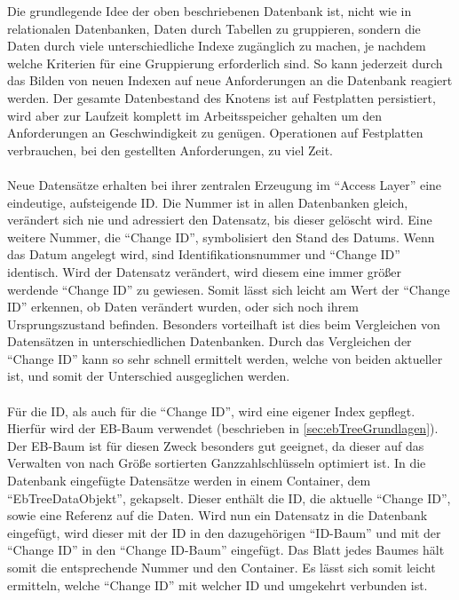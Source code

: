 \documentclass[a4paper,11pt,oneside,%
headsepline,												%
footsepline,												%
bibtotocnumbered									%
]{scrreprt}
\begin{document}
Die grundlegende Idee der oben beschriebenen Datenbank ist, nicht wie in relationalen Datenbanken, Daten durch Tabellen zu gruppieren, sondern die Daten durch viele unterschiedliche Indexe zugänglich zu machen, je nachdem welche Kriterien für eine Gruppierung erforderlich sind. So kann jederzeit durch das Bilden von neuen Indexen auf neue Anforderungen an die Datenbank reagiert werden. Der gesamte Datenbestand des Knotens ist auf Festplatten persistiert, wird aber zur Laufzeit komplett im Arbeitsspeicher gehalten um den Anforderungen an Geschwindigkeit zu genügen. Operationen auf Festplatten verbrauchen, bei den gestellten Anforderungen, zu viel Zeit.\\\\
Neue Datensätze erhalten bei ihrer zentralen Erzeugung im \enquote{Access Layer} eine eindeutige, aufsteigende \ac{ID}. Die Nummer ist in allen Datenbanken gleich, verändert sich nie und adressiert den Datensatz, bis dieser gelöscht wird. Eine weitere Nummer, die \enquote{Change ID}, symbolisiert den Stand des Datums. Wenn das Datum angelegt wird, sind Identifikationsnummer und \enquote{Change ID} identisch. Wird der Datensatz verändert, wird diesem eine immer größer werdende \enquote{Change ID} zu gewiesen. Somit lässt sich leicht am Wert der \enquote{Change ID}  erkennen, ob Daten verändert wurden, oder sich noch ihrem Ursprungszustand befinden. Besonders vorteilhaft ist dies beim Vergleichen von Datensätzen in unterschiedlichen Datenbanken. Durch das Vergleichen der \enquote{Change ID} kann so sehr schnell ermittelt werden, welche von beiden aktueller ist, und somit der Unterschied ausgeglichen werden.\\\\
Für die \ac{ID}, als auch für die \enquote{Change ID}, wird eine eigener Index gepflegt. Hierfür wird der \ac{EB-Baum} verwendet (beschrieben in \autoref{sec:ebTreeGrundlagen}). Der \ac{EB-Baum} ist für diesen Zweck besonders gut geeignet, da dieser auf das Verwalten von nach Größe sortierten Ganzzahlschlüsseln optimiert ist. In die Datenbank eingefügte Datensätze werden in einem Container, dem \enquote{EbTreeDataObjekt}, gekapselt. Dieser enthält  die \ac{ID}, die aktuelle \enquote{Change ID}, sowie eine Referenz auf die Daten. Wird nun ein Datensatz in die Datenbank eingefügt, wird dieser mit der \ac{ID} in den dazugehörigen \enquote{ID-Baum} und mit der \enquote{Change ID} in den \enquote{Change ID-Baum} eingefügt. Das Blatt jedes Baumes hält somit die entsprechende Nummer und den Container. Es lässt sich somit leicht ermitteln, welche \enquote{Change ID} mit welcher \ac{ID} und umgekehrt verbunden ist. \\\\
\end{document}

